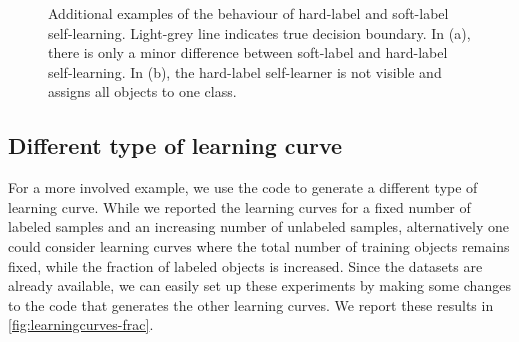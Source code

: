 \documentclass[runningheads,a4paper]{llncs}\usepackage[]{graphicx}\usepackage[]{color}
\newenvironment{knitrout}{}{} %
\begin{document}
\begin{knitrout}
\color{fgcolor}\begin{figure}
\caption[Additional examples of the behaviour of hard-label and soft-label self-learning]{Additional examples of the behaviour of hard-label and soft-label self-learning. Light-grey line indicates true decision boundary. In (a), there is only a minor difference between soft-label and hard-label self-learning. In (b), the hard-label self-learner is not visible and assigns all objects to one class.}\label{fig:example-additional}
\end{figure}


\end{knitrout}

\subsection{Different type of learning curve}
For a more involved example, we use the code to generate a different type of learning curve. While we reported the learning curves for a fixed number of labeled samples and an increasing number of unlabeled samples, alternatively one could consider learning curves where the total number of training objects remains fixed, while the fraction of labeled objects is increased. Since the datasets are already available, we can easily set up these experiments by making some changes to the code that generates the other learning curves. We report these results in \cref{fig:learningcurves-frac}.
\end{document}
